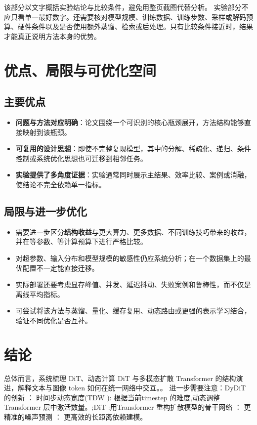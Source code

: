 \documentclass[UTF8,11pt,a4paper]{ctexart}
\newcommand{\term}[1]{\textbf{\textcolor{mainblue}{#1}}}
\begin{document}
该部分以文字概括实验结论与比较条件，避免用整页截图代替分析。
实验部分不应只看单一最好数字。还需要核对模型规模、训练数据、训练步数、采样或解码预算、硬件条件以及是否使用额外蒸馏、检索或后处理。只有比较条件接近时，结果才能真正说明方法本身的优势。

\section{优点、局限与可优化空间}
\subsection{主要优点}
\begin{itemize}
\item \term{问题与方法对应明确}：论文围绕一个可识别的核心瓶颈展开，方法结构能够直接映射到该瓶颈。
\item \term{可复用的设计思想}：即使不完整复现模型，其中的分解、稀疏化、递归、条件控制或系统优化思想也可迁移到相邻任务。
\item \term{实验提供了多角度证据}：实验通常同时展示主结果、效率比较、案例或消融，使结论不完全依赖单一指标。
\end{itemize}

\subsection{局限与进一步优化}
\begin{itemize}
\item 需要进一步区分\term{结构收益}与更大算力、更多数据、不同训练技巧带来的收益，并在等参数、等计算预算下进行严格比较。
\item 对超参数、输入分布和模型规模的敏感性仍应系统分析；在一个数据集上的最优配置不一定能直接迁移。
\item 实际部署还要考虑显存峰值、并发、延迟抖动、失败案例和鲁棒性，而不仅是离线平均指标。
\item 可尝试将该方法与蒸馏、量化、缓存复用、动态路由或更强的表示学习结合，验证不同优化是否互补。
\end{itemize}

\section{结论}
总体而言，系统梳理 DiT、动态计算 DiT 与多模态扩散 Transformer 的结构演进，解释文本与图像 token 如何在统一网络中交互。。 进一步需要注意：DyDiT 的创新 ： 时间步动态宽度(TDW ): 根据当前timestep 的难度,动态调整 Transformer 层中激活数量。;DiT :用Transformer 重构扩散模型的骨干网络 ： 更精准的噪声预测 ： 更高效的长距离依赖建模。
\end{document}
